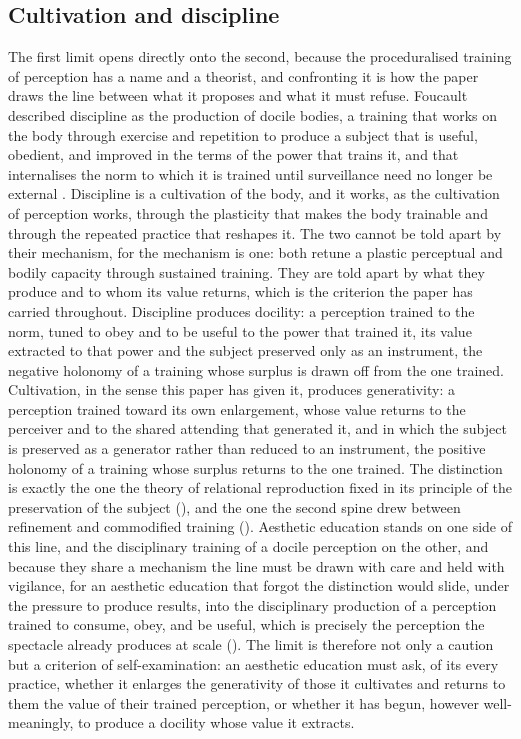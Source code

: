 \subsection{Cultivation and discipline}
\label{p23:sub:limits-discipline}

The first limit opens directly onto the second, because the proceduralised training of perception has a name and a theorist, and confronting it is how the paper draws the line between what it proposes and what it must refuse. Foucault described discipline as the production of docile bodies, a training that works on the body through exercise and repetition to produce a subject that is useful, obedient, and improved in the terms of the power that trains it, and that internalises the norm to which it is trained until surveillance need no longer be external \parencite{foucault1977}. Discipline is a cultivation of the body, and it works, as the cultivation of perception works, through the plasticity that makes the body trainable and through the repeated practice that reshapes it. The two cannot be told apart by their mechanism, for the mechanism is one: both retune a plastic perceptual and bodily capacity through sustained training. They are told apart by what they produce and to whom its value returns, which is the criterion the paper has carried throughout. Discipline produces docility: a perception trained to the norm, tuned to obey and to be useful to the power that trained it, its value extracted to that power and the subject preserved only as an instrument, the negative holonomy of a training whose surplus is drawn off from the one trained. Cultivation, in the sense this paper has given it, produces generativity: a perception trained toward its own enlargement, whose value returns to the perceiver and to the shared attending that generated it, and in which the subject is preserved as a generator rather than reduced to an instrument, the positive holonomy of a training whose surplus returns to the one trained. The distinction is exactly the one the theory of relational reproduction fixed in its principle of the preservation of the subject (), and the one the second spine drew between refinement and commodified training (). Aesthetic education stands on one side of this line, and the disciplinary training of a docile perception on the other, and because they share a mechanism the line must be drawn with care and held with vigilance, for an aesthetic education that forgot the distinction would slide, under the pressure to produce results, into the disciplinary production of a perception trained to consume, obey, and be useful, which is precisely the perception the spectacle already produces at scale (). The limit is therefore not only a caution but a criterion of self-examination: an aesthetic education must ask, of its every practice, whether it enlarges the generativity of those it cultivates and returns to them the value of their trained perception, or whether it has begun, however well-meaningly, to produce a docility whose value it extracts.

